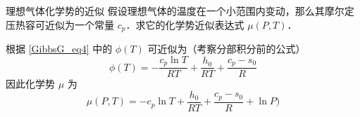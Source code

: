 \begin{example}{理想气体化学势的近似}
假设理想气体的温度在一个小范围内变动，那么其摩尔定压热容可近似为一个常量 $c_p$．求它的化学势近似表达式 $\mu(P,T)$．

根据 \autoref{GibbsG_eq4} 中的 $\phi(T)$ 可近似为（考察分部积分前的公式）
\begin{equation}
\phi(T)=-\frac{c_p\ln T}{RT}+\frac{h_0}{RT}+\frac{c_p-s_0}{R}
\end{equation}
因此化学势 $\mu$ 为
\begin{equation}
\mu(P,T)=-c_p\ln T+\frac{h_0}{RT}+\frac{c_p-s_0}{R}+\ln P)
\end{equation}

\end{example}
